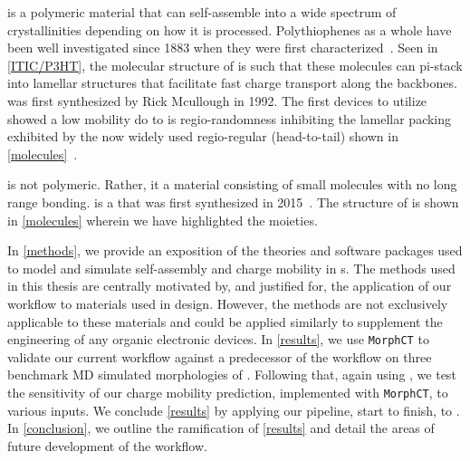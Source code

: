  is a polymeric material that can self-assemble into a wide spectrum of
crystallinities depending on how it is processed.
Polythiophenes as a whole have been well investigated 
since 1883 when they were first characterized~\cite{Poelking2014}.
Seen in \autoref{ITIC/P3HT}, the molecular structure of 
is such that these molecules can pi-stack into lamellar structures that facilitate fast charge transport along
the backbones.  was first synthesized by Rick Mcullough in 1992. The first devices to utilize  showed
a low mobility do to is regio-randomness inhibiting the lamellar packing exhibited by the now widely used
regio-regular (head-to-tail)  shown in \autoref{molecules}~\cite{Zaumseil2014}. 

 is not polymeric. Rather, it a material consisting of small molecules with no long range bonding.
 is a  that was first synthesized in 2015~\cite{Bai201U}. The structure of  is shown in
\autoref{molecules} wherein we have highlighted the moieties.  

In \autoref{methods}, we
provide an exposition of the theories and software packages used to model and simulate self-assembly and
charge mobility in
s.
The methods used in this thesis are centrally motivated by, and justified for, 
the application of our workflow to materials
used in  design. However, the methods are
not exclusively applicable to these materials and could be applied similarly to supplement the engineering of any organic
electronic devices. 
In \autoref{results}, we use \texttt{MorphCT} to validate our current workflow against a predecessor of the 
workflow on three benchmark MD simulated morphologies of . 
Following that, again using , we test the sensitivity of our charge mobility prediction, 
implemented with \texttt{MorphCT}, to various inputs. We conclude \autoref{results} by applying our pipeline,
start to finish, to . 
In \autoref{conclusion}, we outline the ramification of \autoref{results} and detail the areas of future development of the workflow. 

